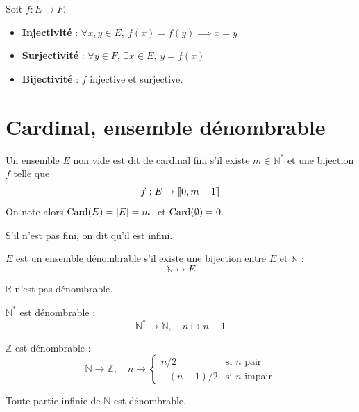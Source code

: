Soit $f:E\to F$.
\begin{itemize}
\item \textbf{Injectivité} : $\forall x,y\in E,\ f(x)=f(y) \implies x=y$
\item \textbf{Surjectivité} : $\forall y\in F,\ \exists x\in E,\ y=f(x)$
\item \textbf{Bijectivité} : $f$ injective et surjective.
\end{itemize}

\section{Cardinal, ensemble dénombrable}

\begin{defi}
Un ensemble $E$ non vide est dit de cardinal fini s'il existe $m\in\mathbb{N}^*$ et une bijection $f$ telle que
\[f : E \to \llbracket 0,m-1 \rrbracket\]
On note alors $\operatorname{Card}(E) = |E| = m$, et $\operatorname{Card}(\emptyset)=0$.

S'il n'est pas fini, on dit qu'il est infini.
\end{defi}

\begin{defi}
$E$ est un ensemble dénombrable s'il existe une bijection entre $E$ et $\mathbb{N}$ :
\[\mathbb{N} \longleftrightarrow E\]
\end{defi}

\begin{exemple}
$\mathbb{R}$ n'est pas dénombrable.

$\mathbb{N}^*$ est dénombrable :
\[\mathbb{N}^* \to \mathbb{N}, \quad n \mapsto n-1\]

$\mathbb{Z}$ est dénombrable :
\[\mathbb{N} \to \mathbb{Z}, \quad n \mapsto \begin{cases} n/2 & \text{si } n \text{ pair} \\ -(n-1)/2 & \text{si } n \text{ impair} \end{cases}\]
\end{exemple}

\begin{prop}
\label{prop:partie-infinie-N}
Toute partie infinie de $\mathbb{N}$ est dénombrable.
\end{prop}

